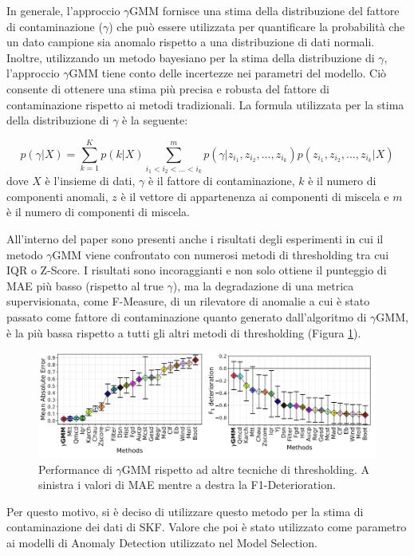In generale, l'approccio $\gamma$GMM fornisce una stima della distribuzione del fattore di contaminazione ($\gamma$) che può essere utilizzata per quantificare la probabilità che un dato campione sia anomalo rispetto a una distribuzione di dati normali. Inoltre, utilizzando un metodo bayesiano per la stima della distribuzione di $\gamma$, l'approccio $\gamma$GMM tiene conto delle incertezze nei parametri del modello. Ciò consente di ottenere una stima più precisa e robusta del fattore di contaminazione rispetto ai metodi tradizionali.
La formula utilizzata per la stima della distribuzione di $\gamma$ è la seguente:

\[p(\gamma | X) = \sum_{k=1}^{K} p(k | X) \sum_{i_1 < i_2 <...< i_k}^{m} p(\gamma | z_{i_1}, z_{i_2},..., z_{i_k}) p(z_{i_1}, z_{i_2},..., z_{i_k} | X)\]
dove $X$ è l'insieme di dati, $\gamma$ è il fattore di contaminazione, $k$ è il numero di componenti anomali, $z$ è il vettore di appartenenza ai componenti di miscela e $m$ è il numero di componenti di miscela.

All'interno del paper sono presenti anche i risultati degli esperimenti in cui il metodo $\gamma$GMM viene confrontato con numerosi metodi di thresholding tra cui IQR o Z-Score. I risultati sono incoraggianti e non solo ottiene il punteggio di MAE più basso (rispetto al true $\gamma$), ma la degradazione di una metrica supervisionata, come F-Measure, di un rilevatore di anomalie a cui è stato passato come fattore di contaminazione quanto generato dall'algoritmo di $\gamma$GMM, è la più bassa rispetto a tutti gli altri metodi di thresholding (Figura \ref{ygmm2}). 

\begin{figure}[t]
	\centering
	\includegraphics[width=14cm, scale=1]{images/ygmm2}
	\caption{Performance di $\gamma$GMM rispetto ad altre tecniche di thresholding. A sinistra i valori di MAE mentre a destra la F1-Deterioration.}
	\label{ygmm2}
\end{figure}

Per questo motivo, si è deciso di utilizzare questo metodo per la stima di contaminazione dei dati di SKF. Valore che poi è stato utilizzato come parametro ai modelli di Anomaly Detection utilizzato nel Model Selection.
